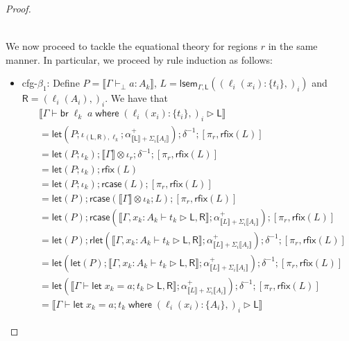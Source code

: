 \documentclass[acmsmall,screen,review]{acmart}
\newcommand{\ms}[1]{\ensuremath{\mathsf{#1}}}
\newcommand{\lto}{:}
\newcommand{\letstmt}[3]{\ensuremath{\ms{let}\;#1 = #2; #3}}
\newcommand{\brb}[2]{\ms{br}\;#1\;#2}
\newcommand{\where}[2]{#1\;\ms{where}\;#2}
\newcommand{\wbranch}[3]{#1(#2) \lto \{#3\}}
\newcommand{\bhyp}[2]{#1 : #2}
\newcommand{\hasty}[4]{#1 \vdash_{#2} #3: {#4}}
\newcommand{\haslb}[3]{#1 \vdash #2 \rhd #3}
\newcommand{\brle}[1]{{\textsf{#1}}}
\newcommand{\dnt}[1]{\llbracket{#1}\rrbracket}
\newcommand{\loopmor}[3]{\ms{lsem}_{#1, #3}(#2)}
\newcommand{\lmor}[1]{\ms{let}(#1)}
\newcommand{\rlmor}[1]{\ms{rlet}(#1)}
\newcommand{\rcase}[1]{\ms{rcase}(#1)}
\newcommand{\rfix}[1]{\ms{rfix}(#1)}
\begin{document}
\begin{proof}
\begin{itemize}[leftmargin=*]
\begin{align*}
    \end{align*}
  \end{itemize}
  We now proceed to tackle the equational theory for regions $r$ in the same manner. In particular,
  we proceed by rule induction as follows:
  \begin{itemize}[leftmargin=*]
    \item \brle{cfg-$\beta_1$}: 
    Define $P = \dnt{\hasty{\Gamma}{\bot}{a}{A_k}}$, %
           $L = \loopmor{\Gamma}{(\wbranch{\ell_i}{x_i}{t_i},)_i}{\ms{L}}$ and %
           $\ms{R} = (\ell_i(A_i),)_i$. %
    We have that
    \begin{equation}
      \begin{aligned}
        & \dnt{\haslb{\Gamma}{\where{\brb{\ell_k}{a}}{(\wbranch{\ell_i}{x_i}{t_i},)_i}}{\ms{L}}} \\
        & = \lmor{
              P ; \iota_{(\ms{L}, \ms{R}), \ell_k} ;
              \alpha^+_{\dnt{\ms{L}} + \Sigma_i \dnt{A_i}}
          } ; \delta^{-1} ; [\pi_r, \rfix{L}] \\
        & = \lmor{P ; \iota_k} ; \dnt{\Gamma} \otimes \iota_r ; \delta^{-1} ; [\pi_r, \rfix{L}] \\
        & = \lmor{P ; \iota_k} ; \rfix{L} \\
        & = \lmor{P ; \iota_k} ; \rcase{L} ; [\pi_r, \rfix{L}] \\
        & = \lmor{P} ; \rcase{\dnt{\Gamma} \otimes \iota_k ; L} ; [\pi_r, \rfix{L}] \\
        & = \lmor{P} 
          ; \rcase{\dnt{\haslb{\Gamma, \bhyp{x_k}{A_k}}{t_k}{\ms{L}, \ms{R}}} 
                    ; \alpha^+_{\dnt{L} + \Sigma_i\dnt{A_i}}} 
          ; [\pi_r, \rfix{L}] \\
        & = \lmor{P} 
          ; \rlmor{\dnt{\haslb{\Gamma, \bhyp{x_k}{A_k}}{t_k}{\ms{L}, \ms{R}}} 
                    ; \alpha^+_{\dnt{L} + \Sigma_i\dnt{A_i}}} 
          ; \delta^{-1}
          ; [\pi_r, \rfix{L}] \\
        & = \lmor{\lmor{P}  
              ; \dnt{\haslb{\Gamma, \bhyp{x_k}{A_k}}{t_k}{\ms{L}, \ms{R}}} 
              ; \alpha^+_{\dnt{L} + \Sigma_i\dnt{A_i}}}
          ; \delta^{-1}
          ; [\pi_r, \rfix{L}] \\
        & = \lmor{
            \dnt{\haslb{\Gamma}{\letstmt{x_k}{a}{t_k}}{\ms{L}, \ms{R}}} 
            ; \alpha^+_{\dnt{L} + \Sigma_i\dnt{A_i}}}
          ; \delta^{-1}
          ; [\pi_r, \rfix{L}] \\
        & = \dnt{
          \haslb{\Gamma}{\where{\letstmt{x_k}{a}{t_k}}{(\wbranch{\ell_i}{x_i}{A_i},)_i}}{\ms{L}}
}
\end{aligned}
\end{equation}
\end{itemize}
\end{proof}
\end{document}

